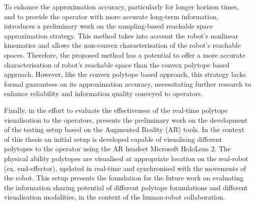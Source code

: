 To enhance the approximation accuracy, particularly for longer horizon times, and to provide the operator with more accurate long-term information,  introduces a preliminary work on the sampling-based reachable space approximation strategy. This method takes into account the robot's nonlinear kinematics and allows the non-convex characterisation of the robot's reachable spaces. Therefore, the proposed method has a potential to offer a more accurate characterisation of robot's reachable space than the convex polytope based approach. However, like the convex polytope based approach, this strategy lacks formal guarantees on its approximation accuracy, necessitating further research to enhance reliability and information quality conveyed to operators. 

Finally, in the effort to evaluate the effectiveness of the real-time polytope visualisation to the operators, 
 presents the preliminary work on the development of the testing setup based on the Augmented Reality (AR) tools. In the context of this thesis an initial setup is developed capable of visualising different polytopes to the operator using the AR headset Microsoft HoloLens 2. The physical ability polytopes are visualised at appropriate location on the real-robot (ex. end-effector), updated in real-time and synchronised with the movements of the robot. This setup presents the foundation for the future work on evaluating the information sharing potential of different polytope formulations and different visualisation modalities, in the context of the human-robot collaboration.

